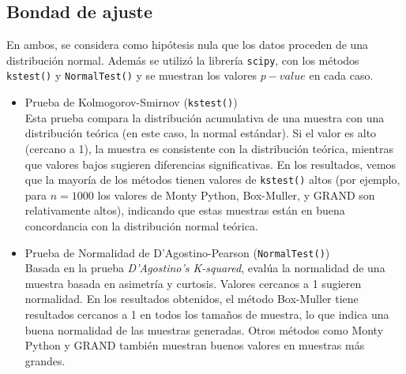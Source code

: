 \subsection{Bondad de ajuste}
En ambos, se considera como hipótesis nula que los datos proceden de una distribución normal.
Además se utilizó la librería \texttt{scipy}, con los métodos \texttt{kstest()} y \texttt{NormalTest()} y se muestran los valores $p-value$ en cada caso.
\begin{itemize}
    \item Prueba de Kolmogorov-Smirnov (\texttt{kstest()})\\
          Esta prueba compara la distribución acumulativa de una muestra con una distribución teórica (en este caso, la normal estándar). Si el valor es alto (cercano a 1), la muestra es consistente con la distribución teórica, mientras que valores bajos sugieren diferencias significativas.
          En los resultados, vemos que la mayoría de los métodos tienen valores de \texttt{kstest()} altos (por ejemplo, para
          $n=1000$ los valores de Monty Python, Box-Muller, y GRAND son relativamente altos), indicando que estas muestras están en buena concordancia con la distribución normal teórica.
    \item Prueba de Normalidad de D'Agostino-Pearson (\texttt{NormalTest()})\\
          Basada en la prueba \textit{D'Agostino's K-squared},
          evalúa la normalidad de una muestra basada en asimetría y curtosis. Valores cercanos a 1 sugieren normalidad.
          En los resultados obtenidos, el método Box-Muller tiene resultados cercanos a 1 en todos los tamaños de muestra, lo que indica una buena normalidad de las muestras generadas. Otros métodos como Monty Python y GRAND también muestran buenos valores en muestras más grandes.
\end{itemize}

